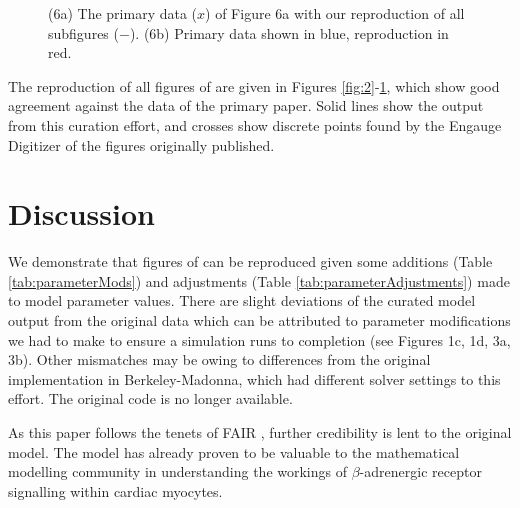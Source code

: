 \documentclass[fleqn,10pt]{physiome}
\begin{document}
\begin{figure}
\begin{subfigure}[b]{0.49\textwidth}
    \end{subfigure}
    \caption{(6a) The primary data ($x$) of Figure 6a with our reproduction of all subfigures ($-$). (6b) Primary data shown in blue, reproduction in red.}
    \label{fig:6}
\end{figure}

The reproduction of all figures of \cite{saucerman2003} are given in Figures \ref{fig:2}-\ref{fig:6}, which show good agreement against the data of the primary paper. Solid lines show the output from this curation effort, and crosses show discrete points found by the Engauge Digitizer of the figures originally published.

\section{Discussion}

We demonstrate that figures of \cite{saucerman2003} can be reproduced given some additions (Table \ref{tab:parameterMods}) and adjustments (Table \ref{tab:parameterAdjustments}) made to model parameter values. There are slight deviations of the curated model output from the original data which can be attributed to parameter modifications we had to make to ensure a simulation runs to completion (see Figures 1c, 1d, 3a, 3b). Other mismatches may be owing to differences from the original implementation in Berkeley-Madonna, which had different solver settings to this effort. The original code is no longer available. 

As this paper follows the tenets of FAIR \citep{wilkinson2016fair}, further credibility is lent to the original model. The model has already proven to be valuable to the mathematical modelling community in understanding the workings of $\beta$-adrenergic receptor signalling within cardiac myocytes.



\end{document}
